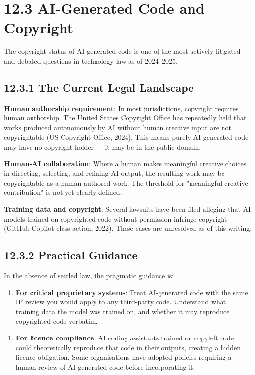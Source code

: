 \documentclass[11pt,a4paper]{book}
\begin{document}
\medskip

\section{12.3 AI-Generated Code and Copyright}

The copyright status of AI-generated code is one of the most actively litigated and debated questions in technology law as of 2024--2025.

\subsection{12.3.1 The Current Legal Landscape}

\textbf{Human authorship requirement}: In most jurisdictions, copyright requires human authorship. The United States Copyright Office has repeatedly held that works produced autonomously by AI without human creative input are not copyrightable (US Copyright Office, 2024). This means purely AI-generated code may have no copyright holder --- it may be in the public domain.

\textbf{Human-AI collaboration}: Where a human makes meaningful creative choices in directing, selecting, and refining AI output, the resulting work may be copyrightable as a human-authored work. The threshold for "meaningful creative contribution" is not yet clearly defined.

\textbf{Training data and copyright}: Several lawsuits have been filed alleging that AI models trained on copyrighted code without permission infringe copyright (GitHub Copilot class action, 2022). These cases are unresolved as of this writing.

\subsection{12.3.2 Practical Guidance}

In the absence of settled law, the pragmatic guidance is:

\begin{enumerate}
  \item \textbf{For critical proprietary systems}: Treat AI-generated code with the same IP review you would apply to any third-party code. Understand what training data the model was trained on, and whether it may reproduce copyrighted code verbatim.
\end{enumerate}

\begin{enumerate}
  \item \textbf{For licence compliance}: AI coding assistants trained on copyleft code could theoretically reproduce that code in their outputs, creating a hidden licence obligation. Some organisations have adopted policies requiring a human review of AI-generated code before incorporating it.
\end{enumerate}
\end{document}
